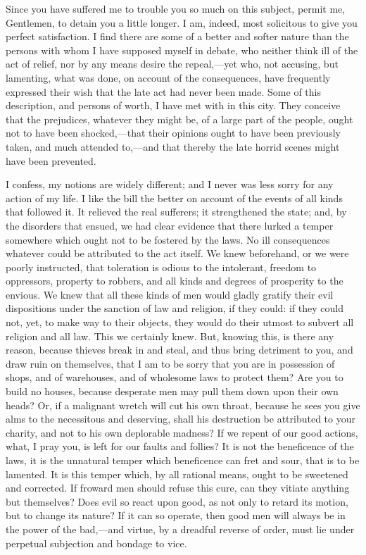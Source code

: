 Since you have suffered me to trouble you so much on this subject, permit me, Gentlemen, to detain you a little longer. I am, indeed, most solicitous to give you perfect satisfaction. I find there are some of a better and softer nature than the persons with whom I have supposed myself in debate, who neither think ill of the act of relief, nor by any means desire the repeal,—yet who, not accusing, but lamenting, what was done, on account of the consequences, have frequently expressed their wish that the late act had never been made. Some of this description, and persons of worth, I have met with in this city. They conceive that the prejudices, whatever they might be, of a large part of the people, ought not to have been shocked,—that their opinions ought to have been previously taken, and much attended to,—and that thereby the late horrid scenes might have been prevented.

I confess, my notions are widely different; and I never was less sorry for any action of my life. I like the bill the better on account of the events of all kinds that followed it. It relieved the real sufferers; it strengthened the state; and, by the disorders that ensued, we had clear evidence that there lurked a temper somewhere which ought not to be fostered by the laws. No ill consequences whatever could be attributed to the act itself. We knew beforehand, or we were poorly instructed, that toleration is odious to the intolerant, freedom to oppressors, property to robbers, and all kinds and degrees of prosperity to the envious. We knew that all these kinds of men would gladly gratify their evil dispositions under the sanction of law and religion, if they could: if they could not, yet, to make way to their objects, they would do their utmost to subvert all religion and all law. This we certainly knew. But, knowing this, is there any reason, because thieves break in and steal, and thus bring detriment to you, and draw ruin on themselves, that I am to be sorry that you are in possession of shops, and of warehouses, and of wholesome laws to protect them? Are you to build no houses, because desperate men may pull them down upon their own heads? Or, if a malignant wretch will cut his own throat, because he sees you give alms to the necessitous and deserving, shall his destruction be attributed to your charity, and not to his own deplorable madness? If we repent of our good actions, what, I pray you, is left for our faults and follies? It is not the beneficence of the laws, it is the unnatural temper which beneficence can fret and sour, that is to be lamented. It is this temper which, by all rational means, ought to be sweetened and corrected. If froward men should refuse this cure, can they vitiate anything but themselves? Does evil so react upon good, as not only to retard its motion, but to change its nature? If it can so operate, then good men will always be in the power of the bad,—and virtue, by a dreadful reverse of order, must lie under perpetual subjection and bondage to vice.

